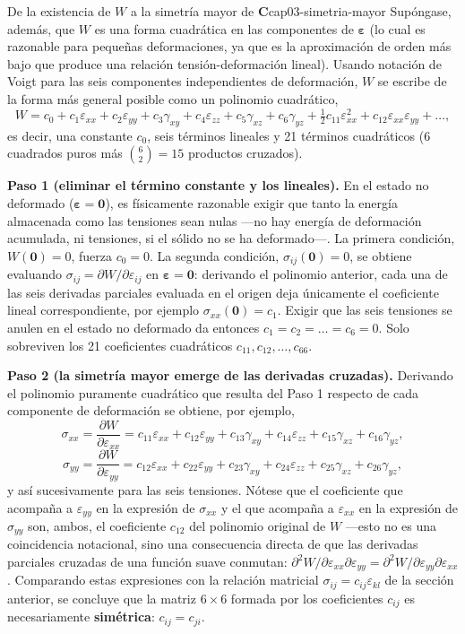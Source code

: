 \begin{teorema}{De la existencia de $W$ a la simetría mayor de $\bm C$}{cap03-simetria-mayor}
Supóngase, además, que $W$ es una forma cuadrática en las componentes de $\bm\varepsilon$ (lo cual es razonable para pequeñas deformaciones, ya que es la aproximación de orden más bajo que produce una relación tensión-deformación lineal). Usando notación de Voigt para las seis componentes independientes de deformación, $W$ se escribe de la forma más general posible como un polinomio cuadrático,
\[
W = c_0 + c_1\varepsilon_{xx}+c_2\varepsilon_{yy}+c_3\gamma_{xy}+c_4\varepsilon_{zz}+c_5\gamma_{xz}+c_6\gamma_{yz} + \tfrac{1}{2}c_{11}\varepsilon_{xx}^2 + c_{12}\varepsilon_{xx}\varepsilon_{yy} + \dots,
\]
es decir, una constante $c_0$, seis términos lineales y 21 términos cuadráticos ($6$ cuadrados puros más $\binom{6}{2}=15$ productos cruzados).

\textbf{Paso 1 (eliminar el término constante y los lineales).} En el estado no deformado ($\bm\varepsilon=\bm 0$), es físicamente razonable exigir que tanto la energía almacenada como las tensiones sean nulas —no hay energía de deformación acumulada, ni tensiones, si el sólido no se ha deformado—. La primera condición, $W(\bm 0)=0$, fuerza $c_0=0$. La segunda condición, $\sigma_{ij}(\bm 0)=0$, se obtiene evaluando $\sigma_{ij}=\partial W/\partial\varepsilon_{ij}$ en $\bm\varepsilon=\bm 0$: derivando el polinomio anterior, cada una de las seis derivadas parciales evaluada en el origen deja únicamente el coeficiente lineal correspondiente, por ejemplo $\sigma_{xx}(\bm 0)=c_1$. Exigir que las seis tensiones se anulen en el estado no deformado da entonces $c_1=c_2=\dots=c_6=0$. Solo sobreviven los 21 coeficientes cuadráticos $c_{11},c_{12},\dots,c_{66}$.

\textbf{Paso 2 (la simetría mayor emerge de las derivadas cruzadas).} Derivando el polinomio puramente cuadrático que resulta del Paso 1 respecto de cada componente de deformación se obtiene, por ejemplo,
\[
\sigma_{xx} = \frac{\partial W}{\partial\varepsilon_{xx}} = c_{11}\varepsilon_{xx}+c_{12}\varepsilon_{yy}+c_{13}\gamma_{xy}+c_{14}\varepsilon_{zz}+c_{15}\gamma_{xz}+c_{16}\gamma_{yz},
\]
\[
\sigma_{yy} = \frac{\partial W}{\partial\varepsilon_{yy}} = c_{12}\varepsilon_{xx}+c_{22}\varepsilon_{yy}+c_{23}\gamma_{xy}+c_{24}\varepsilon_{zz}+c_{25}\gamma_{xz}+c_{26}\gamma_{yz},
\]
y así sucesivamente para las seis tensiones. Nótese que el coeficiente que acompaña a $\varepsilon_{yy}$ en la expresión de $\sigma_{xx}$ y el que acompaña a $\varepsilon_{xx}$ en la expresión de $\sigma_{yy}$ son, ambos, el coeficiente $c_{12}$ del polinomio original de $W$ —esto no es una coincidencia notacional, sino una consecuencia directa de que las derivadas parciales cruzadas de una función suave conmutan: $\partial^2 W/\partial\varepsilon_{xx}\partial\varepsilon_{yy} = \partial^2 W/\partial\varepsilon_{yy}\partial\varepsilon_{xx}$. Comparando estas expresiones con la relación matricial $\sigma_{ij}=c_{ij}\varepsilon_{kl}$ de la sección anterior, se concluye que la matriz $6\times 6$ formada por los coeficientes $c_{ij}$ es necesariamente \textbf{simétrica}: $c_{ij}=c_{ji}$.
\end{teorema}

